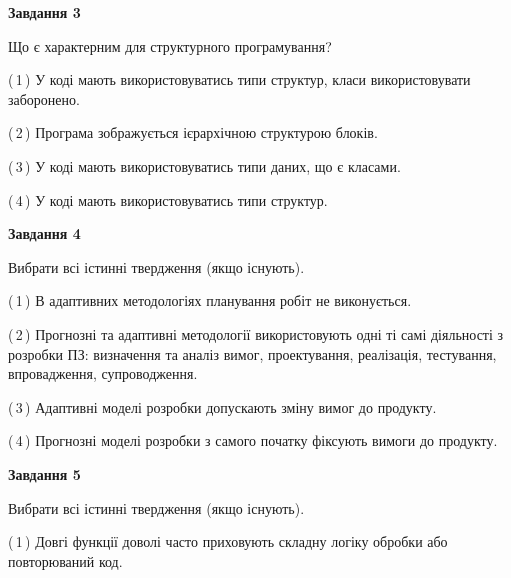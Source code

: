 \documentclass[10pt, ukrainian]{article}
\begin{document}
{\begin {large}
{\begin {center}\textbf{Завдання 3}\end {center}}\par
Що є характерним для структурного програмування?\par
\vspace{2mm}



(\,1\,) У коді мають використовуватись типи структур, класи використовувати заборонено. %



(\,2\,) Програма зображується ієрархічною структурою блоків.%



(\,3\,) У коді мають використовуватись типи даних, що є класами. %



(\,4\,) У коді мають використовуватись типи структур. %


{\begin {center}\textbf{Завдання 4}\end {center}}\par
Вибрати всі істинні твердження (якщо існують).\par
\vspace{2mm}



(\,1\,) В адаптивних методологіях планування робіт не виконується. %



(\,2\,) Прогнозні та адаптивні методології використовують одні ті самі діяльності з розробки ПЗ: визначення та аналіз вимог, проектування, реалізація, тестування, впровадження, супроводження. %



(\,3\,) Адаптивні моделі розробки допускають зміну вимог до продукту. %



(\,4\,) Прогнозні моделі розробки з самого початку фіксують вимоги до продукту. %


{\begin {center}\textbf{Завдання 5}\end {center}}\par
Вибрати всі істинні твердження (якщо існують).\par
\vspace{2mm}



(\,1\,) Довгі функції доволі часто приховують складну логіку обробки або повторюваний код. %




\end{large}}
\end{document}

